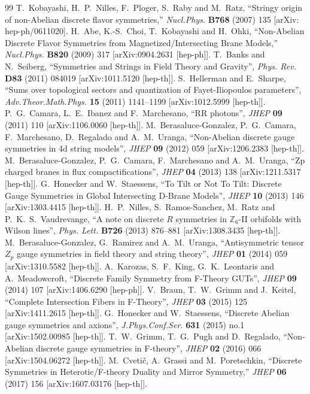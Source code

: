 \documentclass[12pt]{article}
\begin{document}
\begin{thebibliography}{99}
T.~Kobayashi, H.~P.~Nilles, F.~Ploger, S.~Raby and M.~Ratz, ``Stringy origin of non-Abelian discrete flavor symmetries,'' {\it Nucl.Phys.} {\bf B768} (2007) 135 [arXiv: hep-ph/0611020].
 H.~Abe, K.-S.~Choi, T.~Kobayashi and H.~Ohki, ``Non-Abelian Discrete Flavor Symmetries from Magnetized/Intersecting Brane Models,'' {\it Nucl.Phys.} {\bf B820} (2009) 317 [arXiv:0904.2631 [hep-ph]].
T.~Banks and N.~Seiberg, ``Symmetries and Strings in Field Theory and Gravity'', {\it Phys. Rev.} {\bf D83} (2011) 084019 [arXiv:1011.5120 [hep-th]].
S.~Hellerman and E.~Sharpe, ``Sums over topological sectors and quantization of Fayet-Iliopoulos parameters'', {\it Adv.Theor.Math.Phys.} {\bf 15} (2011) 1141--1199 [arXiv:1012.5999 [hep-th]].
P.~G.~Camara, L.~E.~Ibanez and F.~Marchesano, ``RR photons'', {\it JHEP} {\bf 09} (2011) 110 [arXiv:1106.0060 [hep-th]].
M.~Berasaluce-Gonzalez, P.~G.~Camara, F.~Marchesano, D.~Regalado and A.~M.~Uranga, ``Non-Abelian discrete gauge symmetries in 4d string models'', {\it JHEP} {\bf 09} (2012) 059 [arXiv:1206.2383 [hep-th]].
M.~Berasaluce-Gonzalez, P.~G.~Camara, F.~Marchesano and A.~M.~Uranga, ``Zp charged branes in flux compactifications'', {\it JHEP} {\bf 04} (2013) 138 [arXiv:1211.5317 [hep-th]]. 
G.~Honecker and W.~Staessens, ``To Tilt or Not To Tilt: Discrete Gauge Symmetries in Global Intersecting D-Brane Models'', {\it JHEP} {\bf 10} (2013) 146 [arXiv:1303.4415 [hep-th]].
H.~P.~Nilles, S.~Ramos-Sanchez, M.~Ratz and P.~K.~S.~Vaudrevange, ``A note on discrete $R$ symmetries in $\mathbb{Z}_{6}$-II orbifolds with Wilson lines'', {\it Phys. Lett.} {\bf B726} (2013) 876--881 [arXiv:1308.3435 [hep-th]].
M.~Berasaluce-Gonzalez, G.~Ramirez and A.~M.~Uranga, ``Antisymmetric tensor $Z_p$ gauge symmetries in field theory and string theory'', {\it JHEP} {\bf 01} (2014) 059 [arXiv:1310.5582 [hep-th]].
A.~Karozas, S.~F.~King, G.~K.~Leontaris and A.~Meadowcroft, ``Discrete Family Symmetry from F-Theory GUTs'', {\it JHEP} {\bf 09} (2014) 107 [arXiv:1406.6290 [hep-ph]]. 
V.~Braun, T.~W.~Grimm and J.~Keitel, ``Complete Intersection Fibers in F-Theory'', {\it JHEP} {\bf 03} (2015) 125 [arXiv:1411.2615 [hep-th]]. 
G.~Honecker and W.~Staessens, ``Discrete Abelian gauge symmetries and axions'', {\it J.Phys.Conf.Ser.} {\bf 631} (2015) no.1 [arXiv:1502.00985 [hep-th]].
T.~W.~Grimm, T.~G.~Pugh and D.~Regalado, ``Non-Abelian discrete gauge symmetries in F-theory'', {\it JHEP} {\bf 02} (2016) 066 [arXiv:1504.06272 [hep-th]]. 
M.~Cveti\v c, A.~Grassi and M.~Poretschkin, ``Discrete Symmetries in Heterotic/F-theory Duality and Mirror Symmetry,'' {\it JHEP} {\bf 06} (2017) 156 [arXiv:1607.03176 [hep-th]].


\end{thebibliography}
\end{document}
